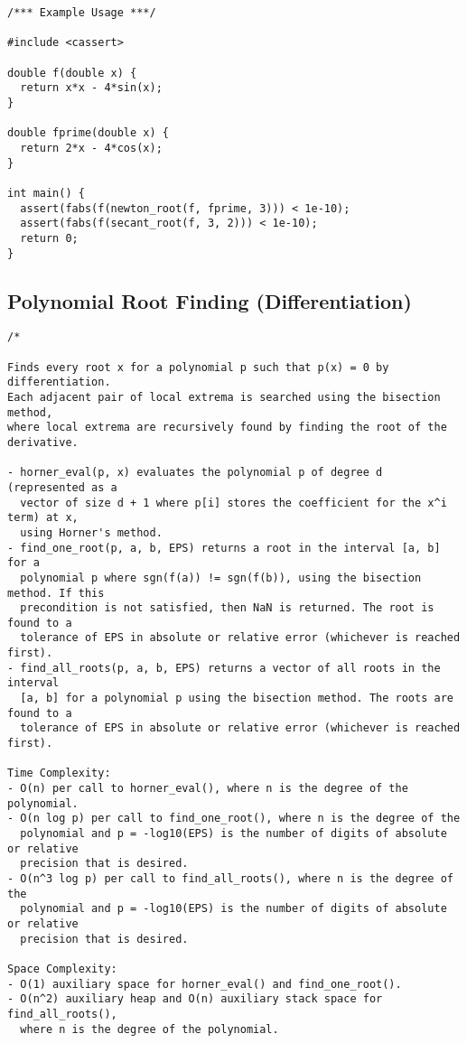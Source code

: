 \begin{lstlisting}
/*** Example Usage ***/

#include <cassert>

double f(double x) {
  return x*x - 4*sin(x);
}

double fprime(double x) {
  return 2*x - 4*cos(x);
}

int main() {
  assert(fabs(f(newton_root(f, fprime, 3))) < 1e-10);
  assert(fabs(f(secant_root(f, 3, 2))) < 1e-10);
  return 0;
}
\end{lstlisting}
\subsection{Polynomial Root Finding (Differentiation)}
\begin{lstlisting}
/*

Finds every root x for a polynomial p such that p(x) = 0 by differentiation.
Each adjacent pair of local extrema is searched using the bisection method,
where local extrema are recursively found by finding the root of the derivative.

- horner_eval(p, x) evaluates the polynomial p of degree d (represented as a
  vector of size d + 1 where p[i] stores the coefficient for the x^i term) at x,
  using Horner's method.
- find_one_root(p, a, b, EPS) returns a root in the interval [a, b] for a
  polynomial p where sgn(f(a)) != sgn(f(b)), using the bisection method. If this
  precondition is not satisfied, then NaN is returned. The root is found to a
  tolerance of EPS in absolute or relative error (whichever is reached first).
- find_all_roots(p, a, b, EPS) returns a vector of all roots in the interval
  [a, b] for a polynomial p using the bisection method. The roots are found to a
  tolerance of EPS in absolute or relative error (whichever is reached first).

Time Complexity:
- O(n) per call to horner_eval(), where n is the degree of the polynomial.
- O(n log p) per call to find_one_root(), where n is the degree of the
  polynomial and p = -log10(EPS) is the number of digits of absolute or relative
  precision that is desired.
- O(n^3 log p) per call to find_all_roots(), where n is the degree of the
  polynomial and p = -log10(EPS) is the number of digits of absolute or relative
  precision that is desired.

Space Complexity:
- O(1) auxiliary space for horner_eval() and find_one_root().
- O(n^2) auxiliary heap and O(n) auxiliary stack space for find_all_roots(),
  where n is the degree of the polynomial.


\end{lstlisting}
